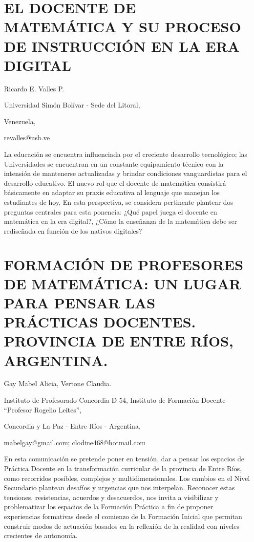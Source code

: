 \section{EL DOCENTE DE MATEMÁTICA Y SU PROCESO DE INSTRUCCIÓN EN LA ERA DIGITAL}

\begin{datos}

Ricardo E. Valles P.

Universidad Simón Bolívar - Sede del Litoral,

Venezuela,

revalles@usb.ve

\end{datos}

La educación se encuentra influenciada por el creciente desarrollo
tecnológico; las Universidades se encuentran en un constante equipamiento
técnico con la intensión de mantenerse actualizadas y brindar condiciones
vanguardistas para el desarrollo educativo. El nuevo rol que el docente
de matemática consistirá básicamente en adaptar su praxis educativa
al lenguaje que manejan los estudiantes de hoy, En esta perspectiva,
se considera pertinente plantear dos preguntas centrales para esta
ponencia: ¿Qué papel juega el docente en matemática en la era digital?,
¿Cómo la enseñanza de la matemática debe ser rediseñada en función
de los nativos digitales? 

\setcounter{section}{199}


\section{\uppercase{ fORMACIÓN DE pROFESORES DE mATEMÁTICA: UN LUGAR PARA
PENSAR LAS PRÁCTICAS dOCENTES. Provincia de Entre Ríos, ARGENTINA.}}

\begin{datos}

Gay Mabel Alicia, Vertone Claudia.

Instituto de Profesorado Concordia D-54, Instituto de Formación Docente
“Profesor Rogelio Leites”,

Concordia y La Paz - Entre Ríos - Argentina,

mabelgay@gmail.com; clodine468@hotmail.com 

\end{datos}

En esta comunicación se pretende poner en tensión, dar a pensar los
espacios de Práctica Docente en la transformación curricular de la
provincia de Entre Ríos, como recorridos posibles, complejos y multidimensionales.
Los cambios en el Nivel Secundario plantean desafíos y urgencias que
nos interpelan. Reconocer estas tensiones, resistencias, acuerdos
y desacuerdos, nos invita a visibilizar y problematizar los espacios
de la Formación Práctica a fin de proponer experiencias formativas
desde el comienzo de la Formación Inicial que permitan construir modos
de actuación basados en la reflexión de la realidad con niveles crecientes
de autonomía.


